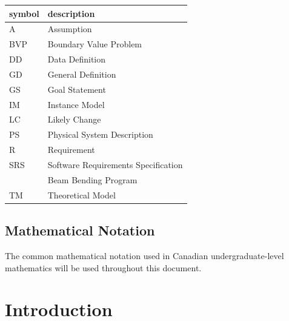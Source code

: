 \documentclass[12pt]{article}
\begin{document}
\begin{center}
    \begin{tabular}{l l}
        \toprule
        \textbf{symbol} & \textbf{description}                \\
        \midrule
        A               & Assumption                          \\
        BVP             & Boundary Value Problem              \\
        DD              & Data Definition                     \\
        GD              & General Definition                  \\
        GS              & Goal Statement                      \\
        IM              & Instance Model                      \\
        LC              & Likely Change                       \\
        PS              & Physical System Description         \\
        R               & Requirement                         \\
        SRS             & Software Requirements Specification \\
        \progname{}     & Beam Bending Program                \\
        TM              & Theoretical Model                   \\
        \bottomrule
    \end{tabular}
\end{center}

\subsection{Mathematical Notation}

The common mathematical notation used in Canadian undergraduate-level
mathematics will be used throughout this document.

\newpage



\section{Introduction}
\end{document}
